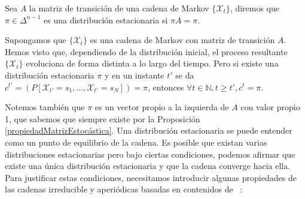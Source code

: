 \begin{definition}
Sea $A$ la matriz de transición de una cadena de Markov $\{\mathcal{X}_t\}$, diremos que $\pi\in\Delta^{n-1}$ es una distribución estacionaria si $\pi A=\pi$.
\end{definition}

Supongamos que $\{\mathcal{X}_t\}$ es una cadena de Markov con matriz de transición $A$. Hemos visto que, dependiendo de la distribución inicial, el proceso resultante $\{\mathcal{X}_t\}$ evoluciona de forma distinta a lo largo del tiempo. Pero si existe una distribución estacionaria $\pi$ y en un instante $t'$ se da $c^{t'}= (P[\mathcal{X}_{t'}=s_1,\dots,\mathcal{X}_{t'}=s_N]) =\pi$, entonces $\forall t\in\mathbb{N}, t\geq t', c^t=\pi$. 

Notemos también que $\pi$ es un vector propio a la izquierda de $A$ con valor propio 1, que sabemos que siempre existe por la Proposición \ref{propiedadMatrizEstocástica}. Una distribución estacionaria se puede entender como un punto de equilibrio de la cadena. Es posible que existan varias distribuciones estacionarias pero bajo ciertas condiciones, podemos afirmar que existe una única distribución estacionaria y que la cadena converge hacia ella. Para justificar estas condiciones, necesitamos introducir algunas propiedades de las cadenas irreducible y aperiódicas basadas en contenidos de ~\cite{Klappenecker}:

